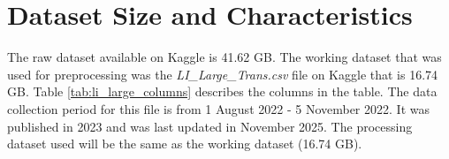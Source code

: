 \section{Dataset Size and Characteristics}

The raw dataset available on Kaggle is 41.62 GB. The working dataset that was used for preprocessing was the \emph{LI\_Large\_Trans.csv} file on Kaggle that is 16.74 GB. Table 
\ref{tab:li_large_columns} describes the columns in the table. The data collection period for this file is from 1 August 2022 - 5 November 2022. It was published in 2023 and was last updated in November 2025. The processing dataset used will be the same as the working dataset (16.74 GB).



